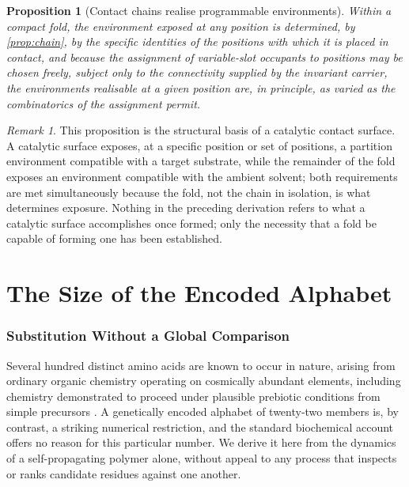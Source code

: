 \documentclass[11pt,twocolumn,a4paper]{article}
\theoremstyle{plain}
\newtheorem{proposition}[theorem]{Proposition}
\theoremstyle{definition}
\theoremstyle{remark}
\newtheorem{remark}[theorem]{Remark}
\begin{document}
\begin{proposition}[Contact chains realise programmable environments]
\label{prop:programmable}
Within a compact fold, the environment exposed at any position is
determined, by \cref{prop:chain}, by the specific identities of the
positions with which it is placed in contact, and because the assignment of
variable-slot occupants to positions may be chosen freely, subject only to
the connectivity supplied by the invariant carrier, the environments
realisable at a given position are, in principle, as varied as the
combinatorics of the assignment permit.
\end{proposition}

\begin{remark}
This proposition is the structural basis of a catalytic contact surface. A
catalytic surface exposes, at a specific position or set of positions, a
partition environment compatible with a target substrate, while the
remainder of the fold exposes an environment compatible with the ambient
solvent; both requirements are met simultaneously because the fold, not the
chain in isolation, is what determines exposure. Nothing in the preceding
derivation refers to what a catalytic surface accomplishes once formed; only
the necessity that a fold be capable of forming one has been established.
\end{remark}

\part{The Size of the Encoded Alphabet}
\label{part:alphabet}

\section{Substitution Without a Global Comparison}
\label{sec:substitution}

Several hundred distinct amino acids are known to occur in nature, arising
from ordinary organic chemistry operating on cosmically abundant elements,
including chemistry demonstrated to proceed under plausible prebiotic
conditions from simple precursors \citep{miller1953}. A genetically
encoded alphabet of twenty-two members is, by contrast, a striking
numerical restriction, and the standard biochemical account offers no
reason for this particular number. We derive it here from the dynamics of
a self-propagating polymer alone, without appeal to any process that
inspects or ranks candidate residues against one another.
\end{document}
